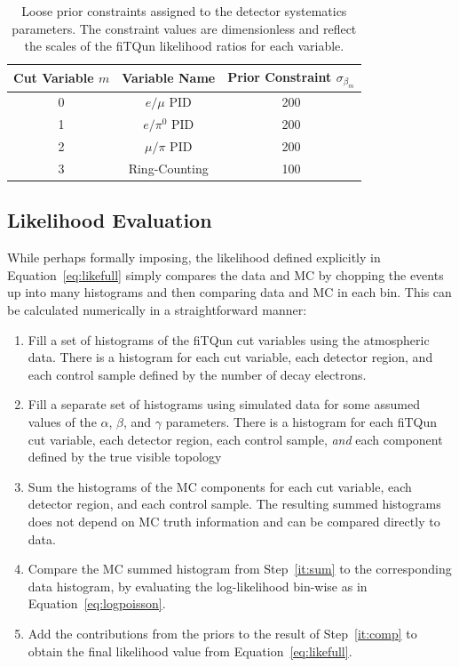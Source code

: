 \begin{table}[h]
  \centering
  \begin{tabular}{c|c|c}
   \hline\hline
   Cut Variable $m$ & Variable Name & Prior Constraint $\sigma_{\beta_{m}}$ \\
   \hline\hline
   0 & $e/\mu$ PID & 200 \\
   1 & $e/\pi^{0}$ PID & 200 \\
   2 & $\mu/\pi$ PID & 200 \\
   3 & Ring-Counting &100 \\
   \hline\hline
  \end{tabular}
  \caption{Loose prior constraints assigned to the detector systematics parameters. The
  constraint values are dimensionless and reflect the scales of the fiTQun likelihood ratios
  for each variable.}
  \label{tab:betaprior}
\end{table}




\subsection{Likelihood Evaluation}
\label{subsec:evalike}

While perhaps formally imposing, the likelihood defined explicitly in
Equation~\ref{eq:likefull} simply compares the data and MC by chopping the
events up into many histograms and then comparing data and MC in each bin.
This can be calculated numerically in a straightforward manner:

\begin{enumerate}
  \item \label{it:first} Fill a set of histograms of the fiTQun cut variables using the atmospheric data.
    There is a histogram for each cut variable, each detector region,
    and each control sample defined by the number of decay electrons.
  \item
    Fill a separate set of histograms using simulated data for some assumed
    values of the $\alpha$, $\beta$, and $\gamma$ parameters. There is a
    histogram for each fiTQun cut variable, each detector region, each control
    sample, \emph{and} each component defined by the true visible topology
  \item \label{it:sum} Sum the histograms of the MC components for each cut
    variable, each detector region, and each control sample. The resulting summed histograms
    does not depend on MC truth information and can be compared directly to data.
  \item
    \label{it:comp} Compare the MC summed histogram from Step~\ref{it:sum} to
    the corresponding data histogram, by evaluating the log-likelihood bin-wise
    as in Equation~\ref{eq:logpoisson}. 
  \item Add the contributions from the
    priors to the result of Step~\ref{it:comp} to obtain the final likelihood
    value from Equation~\ref{eq:likefull}.
\end{enumerate}

